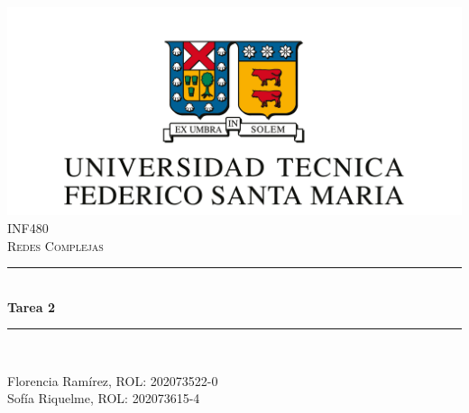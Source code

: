 \documentclass[12pt]{article}
\begin{document}
\begin{titlepage}
\newcommand{\HRule}{\rule{\linewidth}{0.5mm}} 
\center

\includegraphics[scale=0.4]{images/logo-usm.png}\\
\vspace{0.6cm}
\textsc{\large INF480}\\[0.5cm] %
\textsc{\Large Redes Complejas}\\[0.5cm] %

\HRule \\[0.4cm]
{ \huge \bfseries Tarea 2}\\[0.4cm] %
\HRule \\[1.5cm]
 
\begin{minipage}{0.8\textwidth}
\begin{center} \large
Florencia Ramírez, ROL: 202073522-0\\
Sofía Riquelme, ROL: 202073615-4
\end{center}

\end{minipage}\\[2cm]

\vfill 

\end{titlepage}
\end{document}
